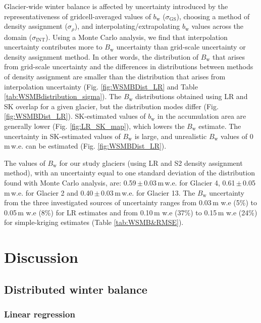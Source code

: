 \documentclass[twocolumn, letterpaper]{igs}
\begin{document}
Glacier-wide winter balance is affected by uncertainty introduced by the representativeness of gridcell-averaged values of $b_\mathrm{w}$ ($\sigma_{\mathrm{GS}}$), choosing a method of density assignment ($\sigma_{\rho}$), and interpolating/extrapolating $b_\mathrm{w}$ values across the domain ($\sigma_{\mathrm{INT}}$). Using a Monte Carlo analysis, we find that interpolation uncertainty contributes more to $B_\mathrm{w}$ uncertainty than grid-scale uncertainty or density assignment method. In other words, the distribution of $B_\mathrm{w}$ that arises from grid-scale uncertainty and the differences in distributions between methods of density assignment are smaller than the distribution that arises from interpolation uncertainty (Fig. \ref{fig:WSMBDist_LR} and Table \ref{tab:WSMBdistribution_sigma}). The $B_\mathrm{w}$ distributions obtained using LR and SK overlap for a given glacier, but the distribution modes differ (Fig. \ref{fig:WSMBDist_LR}). SK-estimated values of $b_\mathrm{w}$ in the accumulation area are generally lower (Fig. \ref{fig:LR_SK_map}), which lowers the $B_\mathrm{w}$ estimate. The uncertainty in SK-estimated values of $B_\mathrm{w}$ is large, and unrealistic $B_\mathrm{w}$ values of 0\,m\,w.e. can be estimated (Fig. \ref{fig:WSMBDist_LR}).

The values of $B_\mathrm{w}$ for our study glaciers (using LR and S2 density assignment method), with an uncertainty equal to one standard deviation of the distribution found with Monte Carlo analysis, are: 0.59\,$\pm$\,0.03\,m\,w.e. for Glacier 4, 0.61\,$\pm$\,0.05\,m\,w.e. for Glacier 2 and 0.40\,$\pm$\,0.03\,m\,w.e. for Glacier 13. The $B_\mathrm{w}$ uncertainty from the three investigated sources of uncertainty ranges from 0.03\,m w.e (5\%) to 0.05\,m w.e (8\%) for LR estimates and from 0.10\,m w.e (37\%) to 0.15\,m w.e (24\%) for simple-kriging estimates (Table \ref{tab:WSMB&RMSE}).

\section{Discussion}

\subsection{Distributed winter balance}

\subsubsection{Linear regression}
\end{document}
